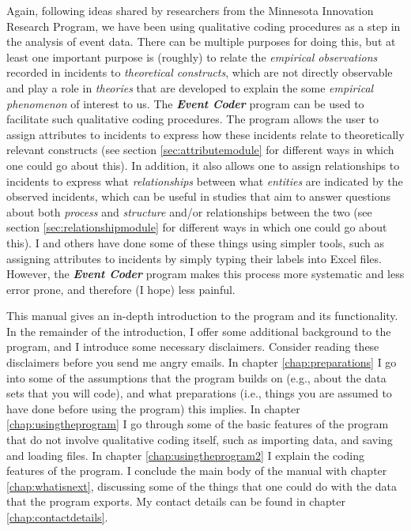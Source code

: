 \documentclass{memoir}
\begin{document}
Again, following ideas shared by researchers from the Minnesota Innovation Research Program, we have been using qualitative coding procedures as a step in the analysis of event data. There can be multiple purposes for doing this, but at least one important purpose is (roughly) to relate the \emph{empirical observations} recorded in incidents to \emph{theoretical constructs}, which are not directly observable and  play a role in \emph{theories} that are developed to explain the some \emph{empirical phenomenon} of interest to us. The \textbf{\emph{Event Coder}} program can be used to facilitate such qualitative coding procedures. The program allows the user to assign attributes to incidents to express how these incidents relate to theoretically relevant constructs (see section \ref{sec:attributemodule} for different ways in which one could go about this). In addition, it also allows one to assign relationships to incidents to express what \emph{relationships} between what \emph{entities} are indicated by the observed incidents, which can be useful in studies that aim to answer questions about both \emph{process} and \emph{structure} and/or relationships between the two (see section \ref{sec:relationshipmodule} for different ways in which one could go about this). I and others have done some of these things using simpler tools, such as assigning attributes to incidents by simply typing their labels into Excel files. However, the \textbf{\emph{Event Coder}} program makes this process more systematic and less error prone, and therefore (I hope) less painful.

This manual gives an in-depth introduction to the program and its functionality. In the remainder of the introduction, I offer some additional background to the program, and I introduce some necessary disclaimers. Consider reading these disclaimers before you send me angry emails. In chapter \ref{chap:preparations} I go into some of the assumptions that the program builds on (e.g., about the data sets that you will code), and what preparations (i.e., things you are assumed to have done before using the program) this implies. In chapter \ref{chap:usingtheprogram} I go through some of the basic features of the program that do not involve qualitative coding itself, such as importing data, and saving and loading files. In chapter \ref{chap:usingtheprogram2} I explain the coding features of the program. I conclude the main body of the manual with chapter \ref{chap:whatisnext}, discussing some of the things that one could do with the data that the program exports. My contact details can be found in chapter \ref{chap:contactdetails}. 
\end{document}

